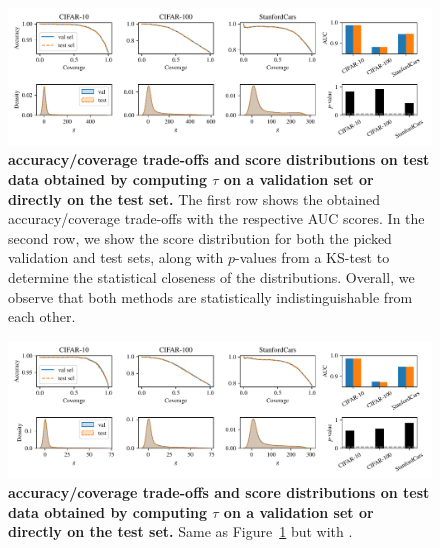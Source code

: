 \begin{figure}[t]
  \centering
  \includegraphics[width=\linewidth]{figs/sptd/train_test_nntd.pdf}
\caption[\sptd accuracy/coverage trade-offs and score distributions on test data obtained by computing $\tau$ on a validation set or directly on the test set.]{\textbf{\sptd accuracy/coverage trade-offs and score distributions on test data obtained by computing $\tau$ on a validation set or directly on the test set.} The first row shows the obtained accuracy/coverage trade-offs with the respective AUC scores. In the second row, we show the score distribution for both the picked validation and test sets, along with $p$-values from a KS-test to determine the statistical closeness of the distributions. Overall, we observe that both methods are statistically indistinguishable from each other. 
}
\label{fig:train_test}
\end{figure}

\begin{figure}[t]
  \centering
  \includegraphics[width=\linewidth]{figs/sptd/train_test_sat.pdf}
\caption[\sat accuracy/coverage trade-offs and score distributions on test data obtained by computing $\tau$ on a validation set or directly on the test set.]{\textbf{\sat accuracy/coverage trade-offs and score distributions on test data obtained by computing $\tau$ on a validation set or directly on the test set.} Same as Figure~\ref{fig:train_test} but with \sat.
}
\label{fig:train_test_sat}
\end{figure}

